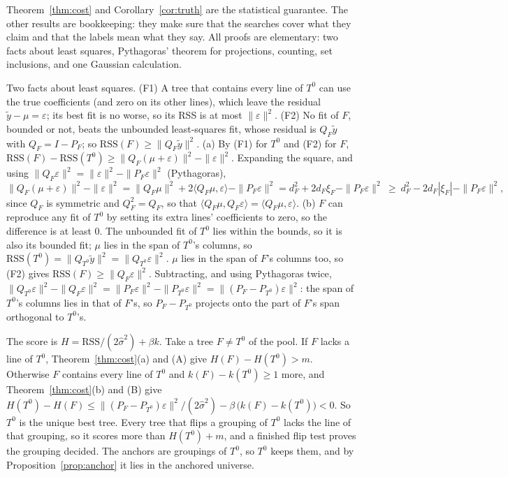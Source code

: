 \documentclass[journal,onecolumn,11pt]{IEEEtran}
\begin{document}
Theorem~\ref{thm:cost} and Corollary~\ref{cor:truth} are the statistical guarantee. The other results are bookkeeping: they
make sure that the searches cover what they claim and that the labels mean what they say. All proofs are elementary: two
facts about least squares, Pythagoras' theorem for projections, counting, set inclusions, and one Gaussian calculation.

\begin{IEEEproof}
Two facts about least squares. (F1) A tree that contains every line of $T^0$ can use the true coefficients (and zero on its
other lines), which leave the residual $\tilde y-\mu=\varepsilon$; its best fit is no worse, so its RSS is at most
$\|\varepsilon\|^2$. (F2) No fit of $F$, bounded or not, beats the unbounded least-squares fit, whose residual is
$Q_F\tilde y$ with $Q_F=I-P_F$; so $\mathrm{RSS}(F)\ge\|Q_F\tilde y\|^2$.
(a) By (F1) for $T^0$ and (F2) for $F$, $\mathrm{RSS}(F)-\mathrm{RSS}(T^0)\ge\|Q_F(\mu+\varepsilon)\|^2-\|\varepsilon\|^2$.
Expanding the square, and using $\|Q_F\varepsilon\|^2=\|\varepsilon\|^2-\|P_F\varepsilon\|^2$ (Pythagoras),
\[
\|Q_F(\mu+\varepsilon)\|^2-\|\varepsilon\|^2=\|Q_F\mu\|^2+2\langle Q_F\mu,\varepsilon\rangle-\|P_F\varepsilon\|^2
=d_F^2+2d_F\xi_F-\|P_F\varepsilon\|^2\ \ge\ d_F^2-2d_F|\xi_F|-\|P_F\varepsilon\|^2 ,
\]
since $Q_F$ is symmetric and $Q_F^2=Q_F$, so that $\langle Q_F\mu,Q_F\varepsilon\rangle=\langle Q_F\mu,\varepsilon\rangle$.
(b) $F$ can reproduce any fit of $T^0$ by setting its extra lines' coefficients to zero, so the difference is at least $0$.
The unbounded fit of $T^0$ lies within the bounds, so it is also its bounded fit; $\mu$ lies in the span of $T^0$'s columns, so
$\mathrm{RSS}(T^0)=\|Q_{T^0}\tilde y\|^2=\|Q_{T^0}\varepsilon\|^2$. $\mu$ lies in the span of $F$'s columns too, so (F2) gives
$\mathrm{RSS}(F)\ge\|Q_F\varepsilon\|^2$. Subtracting, and using Pythagoras twice,
$\|Q_{T^0}\varepsilon\|^2-\|Q_F\varepsilon\|^2=\|P_F\varepsilon\|^2-\|P_{T^0}\varepsilon\|^2=\|(P_F-P_{T^0})\varepsilon\|^2$:
the span of $T^0$'s columns lies in that of $F$'s, so $P_F-P_{T^0}$ projects onto the part of $F$'s span orthogonal to
$T^0$'s.
\end{IEEEproof}

\begin{IEEEproof}
The score is $H=\mathrm{RSS}/(2\hat\sigma^2)+\beta k$. Take a tree $F\ne T^0$ of the pool. If $F$ lacks a line of $T^0$,
Theorem~\ref{thm:cost}(a) and (A) give $H(F)-H(T^0)>m$. Otherwise $F$ contains every line of $T^0$ and $k(F)-k(T^0)\ge1$ more, and Theorem~\ref{thm:cost}(b) and (B) give
$H(T^0)-H(F)\le\|(P_F-P_{T^0})\varepsilon\|^2/(2\hat\sigma^2)-\beta\,\big(k(F)-k(T^0)\big)<0$. So $T^0$ is the unique best
tree. Every tree that flips a grouping of $T^0$ lacks the line of that grouping, so it scores more than $H(T^0)+m$, and a
finished flip test proves the grouping decided. The anchors are groupings of $T^0$, so $T^0$ keeps them, and by
Proposition~\ref{prop:anchor} it lies in the anchored universe.
\end{IEEEproof}
\end{document}
